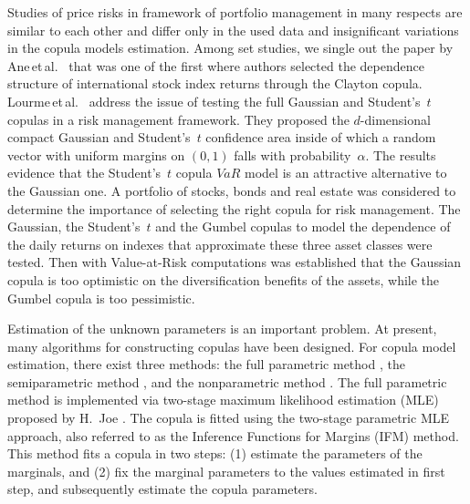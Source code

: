 \documentclass{llncs}
\begin{document}
Studies \cite{Xu2008, Lourme2016, Ane2003, Kole2007} of price risks in framework of portfolio management in many respects are similar to each other and differ only in the used data and insignificant variations in the copula models estimation. Among set studies, we single out the paper by Ane\,et\,al.~\cite{Ane2003} that was one of the first where authors selected the dependence structure of international stock index returns through the Clayton copula. 
%
Lourme\,et\,al.~\cite{Lourme2016} address the issue of testing the full Gaussian
and Student's~$t$ copulas in a risk management framework. They proposed the $d$-dimensional compact Gaussian and Student's~$t$ confidence area inside of
which a random vector with uniform margins on
$(0, 1)$ falls with probability~$\alpha$. 
The results evidence that the Student's~$t$ copula $VaR$ model is an attractive alternative to the Gaussian one.
%
A portfolio of stocks, bonds and real estate was considered \cite{Kole2007} to determine the importance of selecting the right copula for risk management. The Gaussian, the Student’s~$t$ and the Gumbel copulas to model the dependence of the daily returns on indexes that approximate these three asset classes were tested. Then with Value-at-Risk computations was established that the Gaussian copula is too optimistic on the diversification benefits of the assets, while the Gumbel copula is too pessimistic.  

Estimation of the unknown parameters is an important problem. 
At present, many algorithms for constructing copulas have been
designed.
For copula model
estimation, there exist three methods: the full parametric method
\cite{Patton2006}, the semiparametric method \cite{Chen2006, Lourme2016}, and
the nonparametric method \cite{Fermanian2003, Kim2007}. The full parametric
method is implemented via two-stage maximum likelihood estimation
(MLE) proposed by H.~Joe \cite{Joe1997, Joe2014}. %
The copula is fitted using the two-stage parametric MLE approach,
also referred to as the Inference Functions for Margins (IFM) method.
This method fits a copula in two steps:
    (1) estimate the parameters of the marginals, and
    (2) fix the marginal parameters to the values estimated in
first step, and subsequently estimate the copula parameters.
\end{document}
